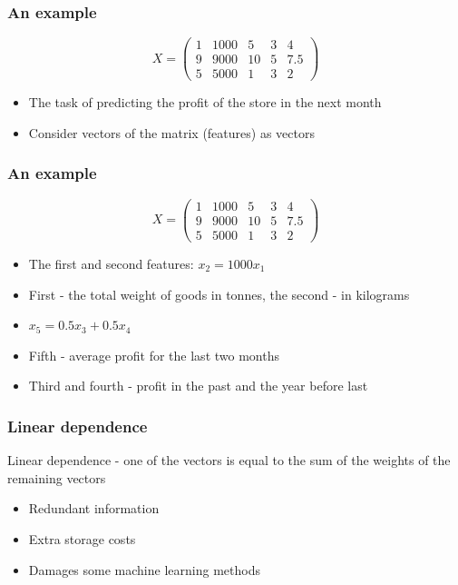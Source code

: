 \documentclass[default]{beamer}
\begin{document}
	\begin{frame}	
		\frametitle{An example}
		
		\Large
		\[
			X = \begin{pmatrix}
				1 & 1000 & 5 & 3 & 4 \\
				9 & 9000 & 10 & 5 & 7.5 \\
				5 & 5000 & 1 & 3 & 2
			\end{pmatrix}
		\]
		\begin{itemize}
			\item The task of predicting the profit of the store in the next month
			\item Consider vectors of the matrix (features) as vectors
		\end{itemize}
		
	\end{frame}

	\begin{frame}	
		\frametitle{An example}
		
		\Large
		\[
		X = \begin{pmatrix}
		1 & 1000 & 5 & 3 & 4 \\
		9 & 9000 & 10 & 5 & 7.5 \\
		5 & 5000 & 1 & 3 & 2
		\end{pmatrix}
		\]
		\begin{itemize}
			\item The first and second features: $x_2 = 1000x_1$
			\item First - the total weight of goods in tonnes, the second - in kilograms
			\item $x_5=0.5x_3+0.5x_4$
			\item Fifth - average profit for the last two months
			\item Third and fourth - profit in the past and the year before last
		\end{itemize}
		
	\end{frame}

	\begin{frame}	
		\frametitle{Linear dependence}
		
		\Large
		Linear dependence - one of the vectors is equal to the sum of the weights of the remaining vectors
		\begin{itemize}
			\item Redundant information
			\item Extra storage costs
			\item Damages some machine learning methods
		\end{itemize}
		
	\end{frame}
\end{document}
